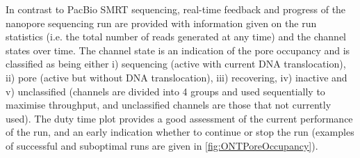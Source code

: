 \newpage
In contrast to PacBio SMRT sequencing, real-time feedback and progress of the nanopore sequencing run are provided with information given on the run statistics (i.e. the total number of reads generated at any time) and the channel states over time. The channel state is an indication of the pore occupancy and is classified as being either i) sequencing (active with current DNA translocation), ii) pore (active but without DNA translocation), iii) recovering, iv) inactive and v) unclassified (channels are divided into 4 groups and used sequentially to maximise throughput, and unclassified channels are those that not currently used). The duty time plot provides a good assessment of the current performance of the run, and an early indication whether to continue or stop the run (examples of successful and suboptimal runs are given in \cref{fig:ONTPoreOccupancy}). 

